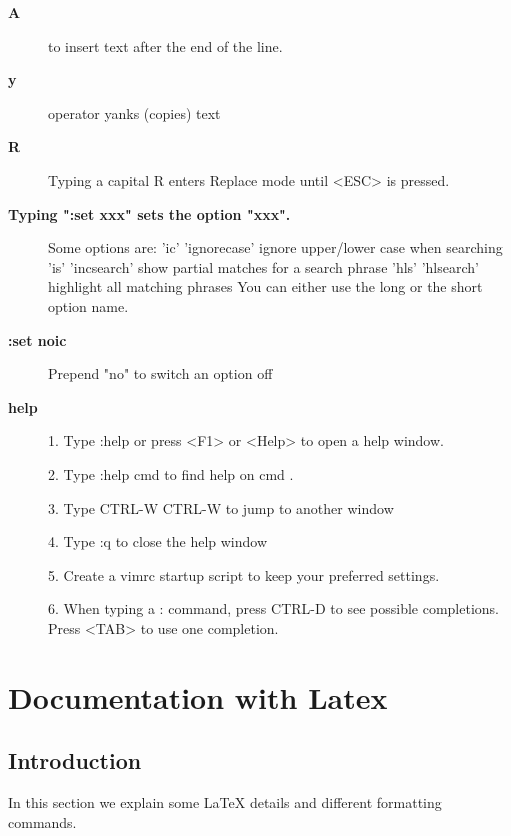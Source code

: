 \documentclass[10pt,a4paper]{scrartcl}
\begin{document}
\begin{description}
\item[\bf{A}] to insert text after the end of the line.

\item[\bf{y}] operator yanks (copies) text

\item[\bf{R}] Typing a capital  R  enters Replace mode until  <ESC>  is pressed.

\item[\bf{Typing ":set xxx" sets the option "xxx".}] 
       Some options are:
        'ic' 'ignorecase'       ignore upper/lower case when searching
        'is' 'incsearch'        show partial matches for a search phrase
        'hls' 'hlsearch'        highlight all matching phrases
       You can either use the long or the short option name.

\item[\bf{:set noic}] Prepend "no" to switch an option off

\item[\bf{help}]
  1. Type  :help  or press <F1> or <Help>  to open a help window.

  2. Type  :help cmd  to find help on  cmd .

  3. Type  CTRL-W CTRL-W  to jump to another window

  4. Type  :q  to close the help window

  5. Create a vimrc startup script to keep your preferred settings.

  6. When typing a  :  command, press CTRL-D to see possible completions.
     Press <TAB> to use one completion.




\end{description}

\section{Documentation with Latex}
\subsection{Introduction} 

In this section we explain some \LaTeX\xspace details and different formatting
commands.
\end{document}
